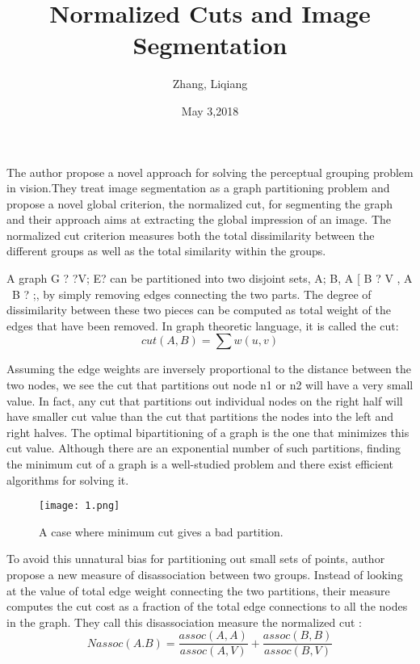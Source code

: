 \documentclass{article}
\author{Zhang, Liqiang}
\date{May 3,2018}
\title{Normalized Cuts and Image Segmentation}
\begin{document}
\maketitle
\par
The author propose a novel approach for solving the perceptual grouping problem in vision.They treat image segmentation as a graph partitioning problem and propose a novel global criterion, the normalized cut, for segmenting the graph and their approach aims at extracting the global impression of an image. The normalized cut criterion measures both the total dissimilarity between the different groups as well as the total similarity within the groups.\cite{Alon1986Eigenvalues}
\par
A graph G ? ?V; E? can be partitioned into two disjoint sets, A; B, A [ B ? V , A \ B ? ;, by simply removing edges connecting the two parts. The degree of dissimilarity between these two pieces can be computed as total weight of the edges that have been removed. In graph theoretic language, it is called the cut:
\begin{equation} \label{}
cut(A,B)=\sum w(u,v)
\end{equation}
\par
Assuming the edge weights are inversely proportional to the distance between the two nodes, we see the cut that partitions out node n1 or n2 will have a very small value. In fact, any cut that partitions out individual nodes on the right half will have smaller cut value than the cut that partitions the nodes into the left and right halves. The optimal bipartitioning of a graph is the one that minimizes this cut value. Although there are an exponential number of such partitions, finding the minimum cut of a graph is a well-studied problem and there exist efficient algorithms for solving it.
\begin{figure}[H]
  \centering
  \texttt{[image: 1.png]}\\
  \caption{A case where minimum cut gives a bad partition.}\label{}
\end{figure}
To avoid this unnatural bias for partitioning out small sets of points, author propose a new measure of disassociation between two groups. Instead of looking at the value of total edge weight connecting the two partitions, their measure computes the cut cost as a fraction of the total edge connections to all the nodes in the graph. They call this disassociation measure the normalized cut :
\begin{equation} \label{}
Nassoc(A.B)=\frac{assoc(A,A)}{assoc(A,V)}+\frac{assoc(B,B)}{assoc(B,V)}
\end{equation}
\par


\end{document}
